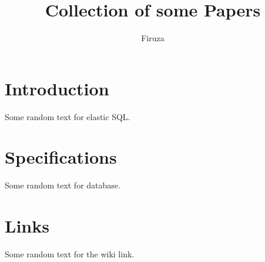 \documentclass[conference]{IEEEtran}
\title{Collection of some Papers}
\author{Firuza}
\date{}
\begin{document}
    \maketitle
    \section{Introduction}
    Some random text for elastic SQL. \cite{Tatemura} \lipsum[1-2]

    \section{Specifications}
    Some random text for database. \cite{ullman} \lipsum[1-2]

    \section{Links}
    Some random text for the wiki link. \cite{wiki} \lipsum[1-2]
    
	
	
\end{document}
